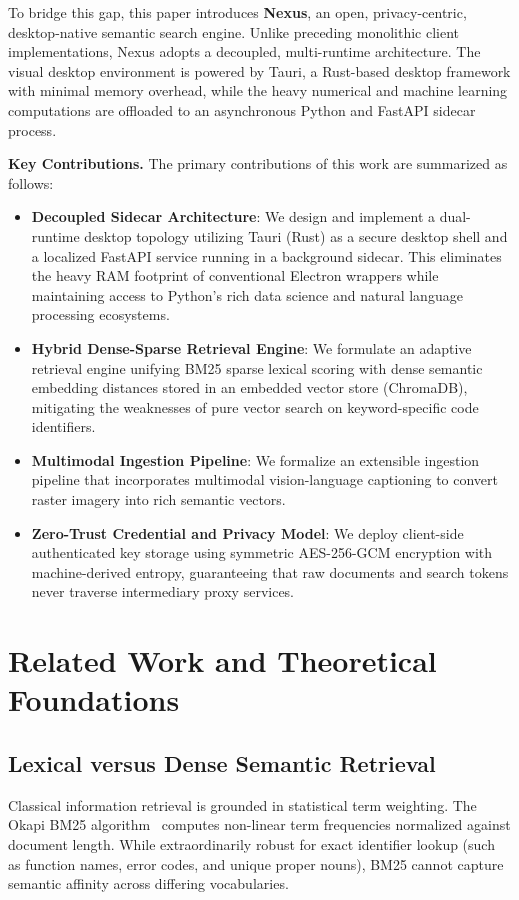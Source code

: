\documentclass[pdflatex,sn-mathphys-num]{sn-jnl}%
\theoremstyle{thmstyleone}%
\theoremstyle{thmstyletwo}%
\theoremstyle{thmstylethree}%
\begin{document}
To bridge this gap, this paper introduces \textbf{Nexus}, an open, privacy-centric, desktop-native semantic search engine. Unlike preceding monolithic client implementations, Nexus adopts a decoupled, multi-runtime architecture. The visual desktop environment is powered by Tauri, a Rust-based desktop framework with minimal memory overhead, while the heavy numerical and machine learning computations are offloaded to an asynchronous Python and FastAPI sidecar process.

\noindent\textbf{Key Contributions.} The primary contributions of this work are summarized as follows:
\begin{itemize}
    \item \textbf{Decoupled Sidecar Architecture}: We design and implement a dual-runtime desktop topology utilizing Tauri (Rust) as a secure desktop shell and a localized FastAPI service running in a background sidecar. This eliminates the heavy RAM footprint of conventional Electron wrappers while maintaining access to Python's rich data science and natural language processing ecosystems.
    \item \textbf{Hybrid Dense-Sparse Retrieval Engine}: We formulate an adaptive retrieval engine unifying BM25 sparse lexical scoring with dense semantic embedding distances stored in an embedded vector store (ChromaDB), mitigating the weaknesses of pure vector search on keyword-specific code identifiers.
    \item \textbf{Multimodal Ingestion Pipeline}: We formalize an extensible ingestion pipeline that incorporates multimodal vision-language captioning to convert raster imagery into rich semantic vectors.
    \item \textbf{Zero-Trust Credential and Privacy Model}: We deploy client-side authenticated key storage using symmetric AES-256-GCM encryption with machine-derived entropy, guaranteeing that raw documents and search tokens never traverse intermediary proxy services.
\end{itemize}

\section{Related Work and Theoretical Foundations}\label{sec2}

\subsection{Lexical versus Dense Semantic Retrieval}\label{subsec2_1}
Classical information retrieval is grounded in statistical term weighting. The Okapi BM25 algorithm~\cite{robertson2009probabilistic} computes non-linear term frequencies normalized against document length. While extraordinarily robust for exact identifier lookup (such as function names, error codes, and unique proper nouns), BM25 cannot capture semantic affinity across differing vocabularies.
\end{document}
